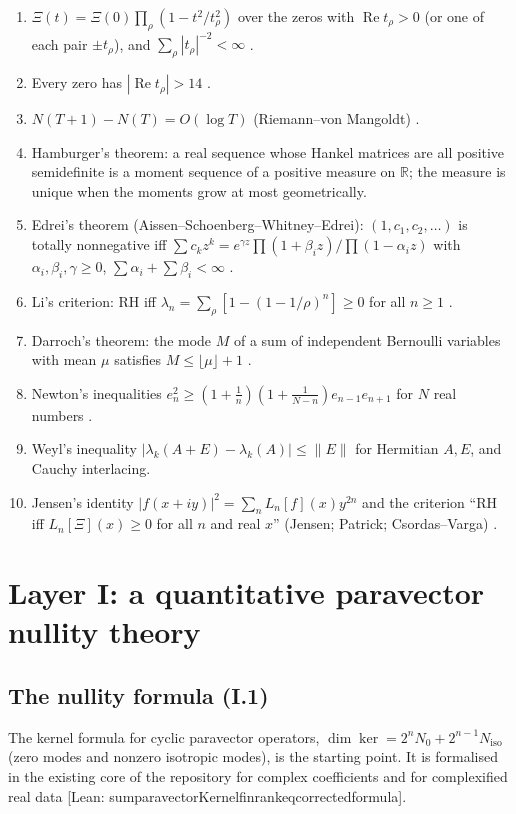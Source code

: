 \documentclass[11pt]{amsart}
\theoremstyle{plain}
\theoremstyle{definition}
\newcommand{\R}{\mathbb{R}}
\newcommand{\leanus}{\textunderscore\allowbreak}
\newcommand{\lean}[1]{{\ttfamily\let\_\leanus #1}}
\begin{document}
\begin{enumerate}[label=(C\arabic*)]
\item\label{C:product} $\Xi(t)=\Xi(0)\prod_{\rho}(1-t^2/t_\rho^2)$ over the zeros
with $\operatorname{Re}t_\rho>0$ (or one of each pair $\pm t_\rho$), and
$\sum_\rho|t_\rho|^{-2}<\infty$ \cite{Titchmarsh}.
\item\label{C:14} Every zero has $|\operatorname{Re}t_\rho|>14$ \cite{Titchmarsh}.
\item\label{C:NT} $N(T+1)-N(T)=O(\log T)$ (Riemann--von Mangoldt) \cite{Titchmarsh}.
\item\label{C:Ham} Hamburger's theorem: a real sequence whose Hankel matrices are all
positive semidefinite is a moment sequence of a positive measure on $\R$;
the measure is unique when the moments grow at most geometrically.
\item\label{C:Edrei} Edrei's theorem (Aissen--Schoenberg--Whitney--Edrei): $(1,c_1,c_2,\dots)$
is totally nonnegative iff $\sum c_kz^k=e^{\gamma z}\prod(1+\beta_iz)/\prod(1-\alpha_iz)$
with $\alpha_i,\beta_i,\gamma\ge0$, $\sum\alpha_i+\sum\beta_i<\infty$ \cite{ASW,Edrei,TPToeplitz}.
\item\label{C:Li} Li's criterion: RH iff $\lambda_n=\sum_\rho[1-(1-1/\rho)^n]\ge0$ for
all $n\ge1$ \cite{Li,BL}.
\item\label{C:Darroch} Darroch's theorem: the mode $M$ of a sum of independent
Bernoulli variables with mean $\mu$ satisfies $M\le\lfloor\mu\rfloor+1$ \cite{Darroch,PoissonBinomial}.
\item\label{C:Newton} Newton's inequalities $e_n^2\ge(1+\frac1n)(1+\frac1{N-n})e_{n-1}e_{n+1}$
for $N$ real numbers \cite{HLP}.
\item\label{C:Weyl} Weyl's inequality $|\lambda_k(A+E)-\lambda_k(A)|\le\|E\|$ for Hermitian $A,E$, and Cauchy interlacing.
\item\label{C:Jensen} Jensen's identity $|f(x+iy)|^2=\sum_nL_n[f](x)y^{2n}$ and the
criterion ``RH iff $L_n[\Xi](x)\ge0$ for all $n$ and real $x$''
(Jensen; Patrick; Csordas--Varga) \cite{CsordasVarga,Cardon}.
\end{enumerate}

\section{Layer I: a quantitative paravector nullity theory}

\subsection{The nullity formula (I.1)}
The kernel formula for cyclic paravector operators,
$\dim\ker=2^{n}N_0+2^{n-1}N_{\mathrm{iso}}$ (zero modes and nonzero isotropic
modes), is the starting point. It is formalised in the existing core of the
repository for complex coefficients and for complexified real data
\lean{[Lean: sum\_paravectorKernel\_finrank\_eq\_corrected\_formula]}.
\end{document}
